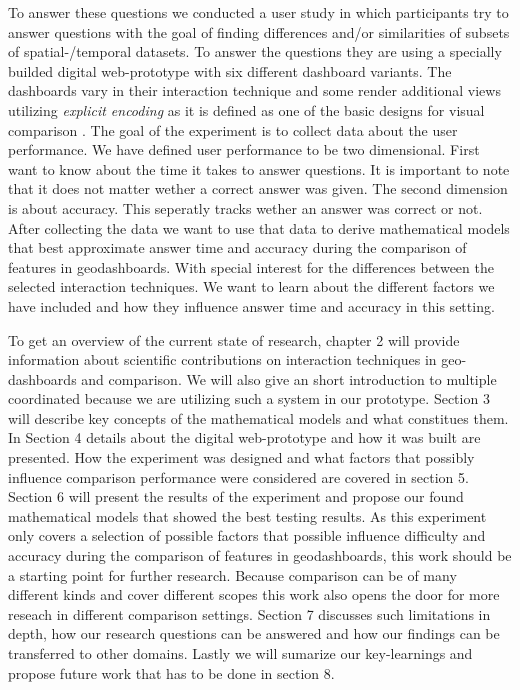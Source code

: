 To answer these questions we conducted a user study in which participants try to answer
questions with the goal of finding differences and/or similarities of subsets
of spatial-/temporal datasets. To answer the
questions they are using a specially builded digital web-prototype with six different dashboard
variants. The dashboards vary in their interaction technique and some render additional views
utilizing \textit{explicit encoding} as it is defined as one of the basic designs for visual
comparison \citep*{Gleicher.2018}. The goal of the experiment is to collect data about the user
performance. We have defined user performance to be two dimensional. First want to know about the time it takes to answer questions. It is
important to note that it does not matter wether a correct answer was given. The second dimension is about accuracy. This seperatly tracks
wether an answer was correct or not. After collecting the data we want to use that data to derive mathematical
models that best approximate answer time and accuracy during the comparison of features in
geodashboards. With special interest for the differences between the selected interaction
techniques. We want to learn about the different factors we have included and how they
influence answer time and accuracy in this setting.

To get an overview of the current state of research, chapter 2 will provide information
about scientific contributions on interaction techniques in geo-dashboards and comparison.
We will also give an short introduction to multiple coordinated because we are utilizing
such a system in our prototype. Section 3 will describe key concepts of the mathematical models and
what constitues them. In Section 4 details about the digital web-prototype and how it was built are presented.
How the experiment was designed and what factors that possibly influence comparison performance were considered
are covered in section 5. Section 6 will present the results of the experiment and propose our found
mathematical models that showed the best testing results.
As this experiment only covers a selection of possible factors that possible influence difficulty and
accuracy during the comparison of features in geodashboards, this work should be a starting point for
further research. Because comparison can be of many different kinds and cover different scopes this work
also opens the door for more reseach in different comparison settings. Section 7 discusses such limitations
in depth, how our research questions can be answered and how our findings can be transferred to other domains.
Lastly we will sumarize our key-learnings and propose future work that has to be done in section 8.